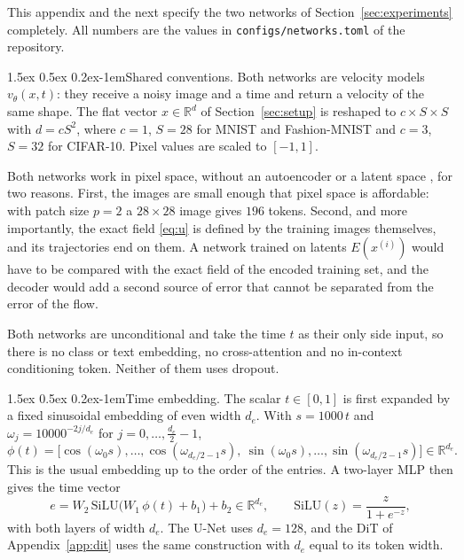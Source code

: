 \documentclass{article}
\makeatletter
\renewcommand{\normalsize}{\fontsize{10pt}{11pt}\selectfont}
\renewcommand{\paragraph}{\@startsection{paragraph}{4}{\z@}%
  {1.5ex \@plus 0.5ex \@minus 0.2ex}{-1em}{\normalsize\bfseries}}
\theoremstyle{remark}
\newcommand{\R}{\mathbb{R}}
\newcommand{\xn}[1]{x^{(#1)}}
\makeatother
\begin{document}
This appendix and the next specify the two networks of Section~\ref{sec:experiments} completely. All numbers are the values in \texttt{configs/networks.toml} of the repository.

\paragraph{Shared conventions.} Both networks are velocity models $v_\theta(x,t)$: they receive a noisy image and a time and return a velocity of the same shape. The flat vector $x \in \R^d$ of Section~\ref{sec:setup} is reshaped to $c \times S \times S$ with $d = cS^2$, where $c = 1$, $S = 28$ for MNIST and Fashion-MNIST and $c = 3$, $S = 32$ for CIFAR-10. Pixel values are scaled to $[-1,1]$.

Both networks work in pixel space, without an autoencoder or a latent space \citep{rombach2022ldm}, for two reasons. First, the images are small enough that pixel space is affordable: with patch size $p = 2$ a $28 \times 28$ image gives $196$ tokens. Second, and more importantly, the exact field \eqref{eq:u} is defined by the training images themselves, and its trajectories end on them. A network trained on latents $E(\xn{i})$ would have to be compared with the exact field of the encoded training set, and the decoder would add a second source of error that cannot be separated from the error of the flow.

Both networks are unconditional and take the time $t$ as their only side input, so there is no class or text embedding, no cross-attention and no in-context conditioning token. Neither of them uses dropout.

\paragraph{Time embedding.} The scalar $t \in [0,1]$ is first expanded by a fixed sinusoidal embedding of even width $d_e$. With $s = 1000\,t$ and $\omega_j = 10000^{-2j/d_e}$ for $j = 0,\dots,\frac{d_e}{2} - 1$,
$$
  \phi(t) = \big[\cos(\omega_0s),\dots,\cos(\omega_{d_e/2 - 1}s),\ \sin(\omega_0s),\dots,\sin(\omega_{d_e/2 - 1}s)\big] \in \R^{d_e}.
$$
This is the usual embedding up to the order of the entries. A two-layer MLP then gives the time vector
$$
  e = W_2\,\mathrm{SiLU}\big(W_1\,\phi(t) + b_1\big) + b_2 \in \R^{d_e},\qquad \mathrm{SiLU}(z) = \frac{z}{1 + e^{-z}},
$$
with both layers of width $d_e$. The U-Net uses $d_e = 128$, and the DiT of Appendix~\ref{app:dit} uses the same construction with $d_e$ equal to its token width.
\end{document}
